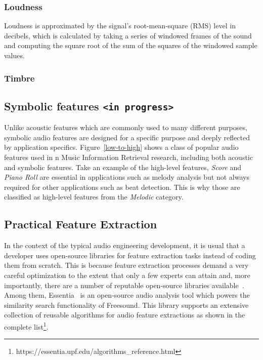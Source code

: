 \subsubsection{Loudness}
Loudness is approximated by the signal's root-mean-square (RMS) level in decibels, which is calculated by taking a series of windowed frames of the sound and computing the square root of the sum of the squares of the windowed sample values.

\subsubsection{Timbre}

\subsection{Symbolic features \texttt{<in progress>}}
Unlike acoustic features which are commonly used to many different purposes, symbolic audio features are designed for a specific purpose and deeply reflected by application specifics. Figure~\ref{low-to-high} shows a class of popular audio features used in n Music Information Retrieval research, including both acoustic and symbolic features. Take an example of the high-level features, \textit{Score} and \textit{Piano Roll} are essential in applications such as melody analysis but not always required for other applications such as beat detection. This is why those are classified as high-level features from the \textit{Melodic} category.

\subsection{Practical Feature Extraction}
In the context of the typical audio engineering development, it is usual that a developer uses open-source libraries for feature extraction tasks instead of coding them from scratch. This is because feature extraction processes demand a very careful optimization to the extent that only a few experts can attain and, more importantly, there are a number of reputable open-source libraries available~\cite{mcfee2015, giannakopoulos2015, bullock2007}. Among them, Essentia~\cite{bogdanov2013} is an open-source audio analysis tool which powers the similarity search functionality of Freesound. This library supports an extensive collection of reusable algorithms for audio feature extractions as shown in the complete list\footnote{https://essentia.upf.edu/algorithms\_reference.html}. 

